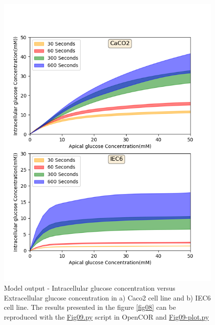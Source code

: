 \documentclass[fleqn,10pt]{physiome}
\begin{document}
\begin{figure}[ht]
	\begin{center}
		\includegraphics[scale=0.7]{fig09.png}
		\caption{\label{fig09} Model output - Intracellular glucose concentration versus Extracellular glucose concentration in a) Caco2 cell line and b) IEC6 cell line. The results presented in the figure \ref{fig08} can be reproduced with the \href{https://models.physiomeproject.org/workspace/572/file/c052b0c460280139dad150937fbee4fa6a026505/SEDML_files/Fig09.py}{Fig09.py} script in OpenCOR and \href{https://models.physiomeproject.org/workspace/572/file/c052b0c460280139dad150937fbee4fa6a026505/SEDML_files/Fig09_plot.py}{Fig09-plot.py}}
	\end{center}
\end{figure}\newpage



\end{document}
